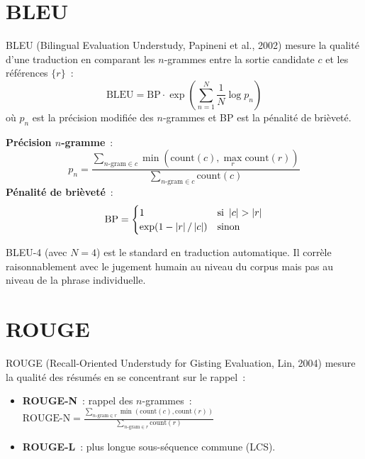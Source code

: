 \section{BLEU}
\label{sec:eval:bleu}

\begin{definition}[BLEU]
BLEU (Bilingual Evaluation Understudy, Papineni et al., 2002) mesure
la qualit\'e d'une traduction en comparant les $n$-grammes entre la
sortie candidate $c$ et les r\'ef\'erences $\{r\}$~:
\[
    \text{BLEU} = \text{BP} \cdot \exp\left(\sum_{n=1}^{N}
    \frac{1}{N} \log p_n\right)
\]
o\`u $p_n$ est la pr\'ecision modifi\'ee des $n$-grammes et BP est la
p\'enalit\'e de bri\`evet\'e.
\end{definition}

\begin{formules}[title=\textbf{Composantes de BLEU}]
\textbf{Pr\'ecision $n$-gramme}~:
\[
    p_n = \frac{\sum_{\text{$n$-gram} \in c}
    \min(\text{count}(c), \max_r \text{count}(r))}
    {\sum_{\text{$n$-gram} \in c} \text{count}(c)}
\]
\textbf{P\'enalit\'e de bri\`evet\'e}~:
\[
    \text{BP} = \begin{cases}
        1 & \text{si } \left| c \right| > \left| r \right| \\
        \exp(1 - \left| r \right|/\left| c \right|) & \text{sinon}
    \end{cases}
\]
\end{formules}

\begin{remarque}
BLEU-4 (avec $N=4$) est le standard en traduction automatique. Il
corr\`ele raisonnablement avec le jugement humain au niveau du corpus
mais pas au niveau de la phrase individuelle.
\end{remarque}

\section{ROUGE}
\label{sec:eval:rouge}

\begin{definition}[ROUGE]
ROUGE (Recall-Oriented Understudy for Gisting Evaluation, Lin, 2004)
mesure la qualit\'e des r\'esum\'es en se concentrant sur le rappel~:
\begin{itemize}
    \item \textbf{ROUGE-N}~: rappel des $n$-grammes~:
    $\text{ROUGE-N} = \frac{\sum_{\text{$n$-gram} \in r}
    \min(\text{count}(c), \text{count}(r))}
    {\sum_{\text{$n$-gram} \in r} \text{count}(r)}$
    \item \textbf{ROUGE-L}~: plus longue sous-s\'equence commune (LCS).
\end{itemize}
\end{definition}

